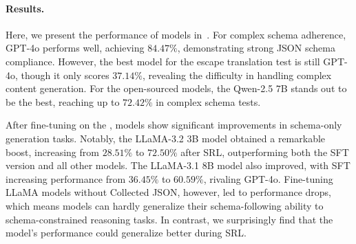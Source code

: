 \paragraph{Results.}
Here, we present the performance of models in~.
For complex schema adherence, GPT-4o performs well, achieving $84.47\%$, demonstrating strong JSON schema compliance. However, the best model for the escape translation test is still GPT-4o, though it only scores $37.14\%$, revealing the difficulty in handling complex content generation.
For the open-sourced models, the Qwen-2.5 7B stands out to be the best, reaching up to $72.42\%$ in complex schema tests.

After fine-tuning on the \ourbench, models show significant improvements in schema-only generation tasks. Notably, the LLaMA-3.2 3B model obtained a remarkable boost, increasing from $28.51\%$ to $72.50\%$ after SRL, outperforming both the SFT version and all other models. The LLaMA-3.1 8B model also improved, with SFT increasing performance from $36.45\%$ to $60.59\%$, rivaling GPT-4o. 
Fine-tuning LLaMA models without Collected JSON, however, led to performance drops, which means models can hardly generalize their schema-following ability to schema-constrained reasoning tasks.
In contrast, we surprisingly find that the model's performance could generalize better during SRL.




